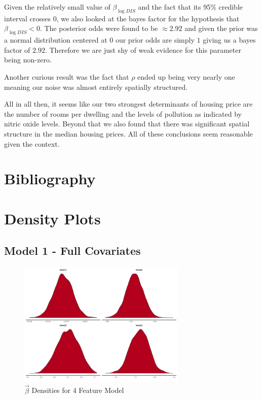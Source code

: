 \documentclass[11pt]{article}
\begin{document}
Given the relatively small value of $\beta_{\log{DIS}}$ and the fact that its 95\% credible interval crosses 0, we also looked at the bayes factor for the hypothesis that $\beta_{\log{DIS}}<0$. The posterior odds were found to be $\approx 2.92$ and given the prior was a normal distribution centered at 0 our prior odds are simply $1$ giving us a bayes factor of $2.92$. Therefore we are just shy of weak evidence for this parameter being non-zero. \newline


Another curious result was the fact that $\rho$ ended up being very nearly one meaning our noise was almost entirely spatially structured. \newline



All in all then, it seems like our two strongest determinants of housing price are the number of rooms per dwelling and the levels of pollution as indicated by nitric oxide levels. Beyond that we also found that there was significant spatial structure in the median housing prices. All of these conclusions seem reasonable given the context. 


\newpage

\section{Bibliography}




\newpage



\section{Density Plots} \label{figures}

\subsection{Model 1 - Full Covariates}

\begin{figure}[h!] 
	\centering
  \includegraphics[height=60mm]{density_betas.png}
  \caption{$\vec{\beta}$ Densities for 4 Feature Model}
  \label{fig:dbetas}
\end{figure}
\end{document}
